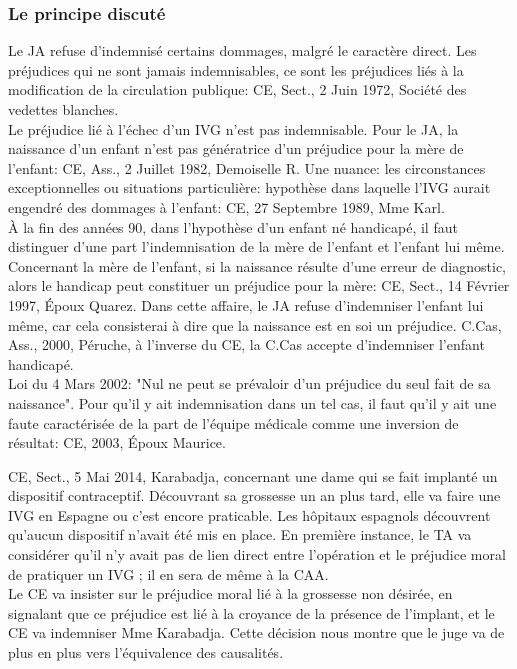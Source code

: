 \documentclass[10pt, a4paper, openany]{book}
\begin{document}
\subsubsection{Le principe discuté}

Le JA refuse d'indemnisé certains dommages, malgré le caractère direct. Les préjudices qui ne sont jamais indemnisables, ce sont les préjudices liés à la modification de la circulation publique: CE, Sect., 2 Juin 1972, Société des vedettes blanches. \\
Le préjudice lié à l'échec d'un IVG n'est pas indemnisable. Pour le JA, la naissance d'un enfant n'est pas génératrice d'un préjudice pour la mère de l'enfant: CE, Ass., 2 Juillet 1982, Demoiselle R. Une nuance: les circonstances exceptionnelles ou situations particulière: hypothèse dans laquelle l'IVG aurait engendré des dommages à l'enfant: CE, 27 Septembre 1989, Mme Karl. \\
À la fin des années 90, dans l'hypothèse d'un enfant né handicapé, il faut distinguer d'une part l'indemnisation de la mère de l'enfant et l'enfant lui même. Concernant la mère de l'enfant, si la naissance résulte d'une erreur de diagnostic, alors le handicap peut constituer un préjudice pour la mère: CE, Sect., 14 Février 1997, Époux Quarez. Dans cette affaire, le JA refuse d'indemniser l'enfant lui même, car cela consisterai à dire que la naissance est en soi un préjudice. C.Cas, Ass., 2000, Péruche, à l'inverse du CE, la C.Cas accepte d'indemniser l'enfant handicapé. \\
Loi du 4 Mars 2002: "Nul ne peut se prévaloir d'un préjudice du seul fait de sa naissance". Pour qu'il y ait indemnisation dans un tel cas, il faut qu'il y ait une faute caractérisée de la part de l'équipe médicale comme une inversion de résultat: CE, 2003, Époux Maurice. 


CE, Sect., 5 Mai 2014, Karabadja, concernant une dame qui se fait implanté un dispositif contraceptif. Découvrant sa grossesse un an plus tard, elle va faire une IVG en Espagne ou c'est encore praticable. Les hôpitaux espagnols découvrent qu'aucun dispositif n'avait été mis en place. En première instance, le TA va considérer qu'il n'y avait pas de lien direct entre l'opération et le préjudice moral de pratiquer un IVG ; il en sera de même à la CAA. \\
Le CE va insister sur le préjudice moral lié à la grossesse non désirée, en signalant que ce préjudice est lié à la croyance de la présence de l'implant, et le CE va indemniser Mme Karabadja. Cette décision nous montre que le juge va de plus en plus vers l'équivalence des causalités. 
\end{document}
